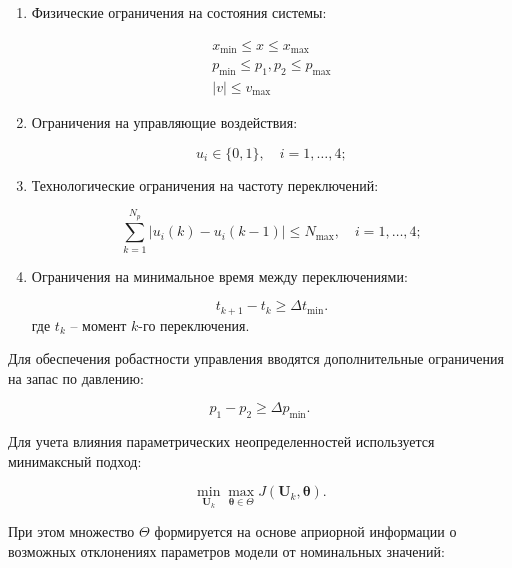 \begin{enumerate}
	\item Физические ограничения на состояния системы:


	      \begin{equation}
		      \begin{aligned}
			      x_{\min} \leq x \leq x_{\max}        \\
			      p_{\min} \leq p_1, p_2 \leq p_{\max} \\
			      |v| \leq v_{\max}
		      \end{aligned}
	      \end{equation}

	\item Ограничения на управляющие воздействия:

	      \begin{equation}
		      u_i \in \{0,1\}, \quad i = 1,\ldots,4;
	      \end{equation}

	\item Технологические ограничения на частоту переключений:

	      \begin{equation}
		      \sum_{k=1}^{N_p} |u_i(k) - u_i(k-1)| \leq N_{\max}, \quad i = 1,\ldots,4;
	      \end{equation}

	\item Ограничения на минимальное время между переключениями:

	      \begin{equation}
		      t_{k+1} - t_k \geq \Delta t_{\min}.
	      \end{equation}
	      где $t_k$ -- момент $k$-го переключения.
\end{enumerate}

Для обеспечения робастности управления вводятся дополнительные ограничения на запас по давлению:

\begin{equation}
	p_1 - p_2 \geq \Delta p_{\min}.
\end{equation}

Для учета влияния параметрических неопределенностей используется минимаксный подход:

\begin{equation}
	\min_{\mathbf{U}_k} \max_{\boldsymbol{\theta} \in \Theta} J(\mathbf{U}_k, \boldsymbol{\theta}).
\end{equation}

При этом множество $\Theta$ формируется на основе априорной информации о
возможных отклонениях параметров модели от номинальных значений:

